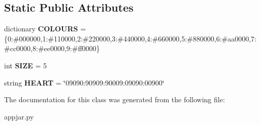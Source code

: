 \subsection*{Static Public Attributes}
\begin{DoxyCompactItemize}
\item 
\mbox{\label{class_python_01_g_u_i_1_1appjar_1_1_micro_bit_simulator_a35273c7db5ea854b4a19a214a6866644}} 
dictionary {\bfseries C\+O\+L\+O\+U\+RS} = \{0\+:\textquotesingle{}\#000000\textquotesingle{},1\+:\textquotesingle{}\#110000\textquotesingle{},2\+:\textquotesingle{}\#220000\textquotesingle{},3\+:\textquotesingle{}\#440000\textquotesingle{},4\+:\textquotesingle{}\#660000\textquotesingle{},5\+:\textquotesingle{}\#880000\textquotesingle{},6\+:\textquotesingle{}\#aa0000\textquotesingle{},7\+:\textquotesingle{}\#cc0000\textquotesingle{},8\+:\textquotesingle{}\#ee0000\textquotesingle{},9\+:\textquotesingle{}\#ff0000\textquotesingle{}\}
\item 
\mbox{\label{class_python_01_g_u_i_1_1appjar_1_1_micro_bit_simulator_a776010bdd59fb14591c2b9693f9f0e63}} 
int {\bfseries S\+I\+ZE} = 5
\item 
\mbox{\label{class_python_01_g_u_i_1_1appjar_1_1_micro_bit_simulator_a6d30267506406d9fd3603bc7dab3da5e}} 
string {\bfseries H\+E\+A\+RT} = \char`\"{}09090\+:90909\+:90009\+:09090\+:00900\char`\"{}
\end{DoxyCompactItemize}


The documentation for this class was generated from the following file\+:\begin{DoxyCompactItemize}
\item 
appjar.\+py\end{DoxyCompactItemize}
